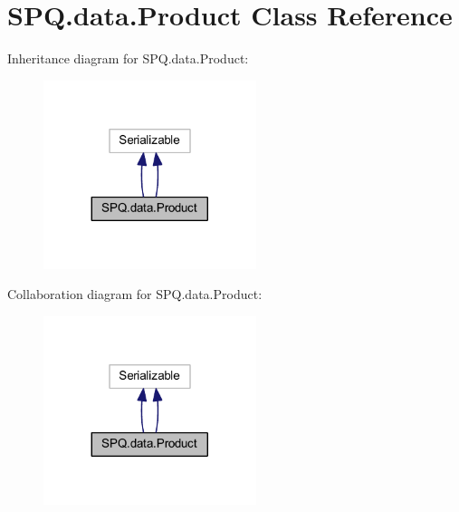 \hypertarget{class_s_p_q_1_1data_1_1_product}{}\section{S\+P\+Q.\+data.\+Product Class Reference}
\label{class_s_p_q_1_1data_1_1_product}


Inheritance diagram for S\+P\+Q.\+data.\+Product\+:
\nopagebreak
\begin{figure}[H]
\begin{center}
\leavevmode
\includegraphics[width=176pt]{class_s_p_q_1_1data_1_1_product__inherit__graph}
\end{center}
\end{figure}


Collaboration diagram for S\+P\+Q.\+data.\+Product\+:
\nopagebreak
\begin{figure}[H]
\begin{center}
\leavevmode
\includegraphics[width=176pt]{class_s_p_q_1_1data_1_1_product__coll__graph}
\end{center}
\end{figure}
